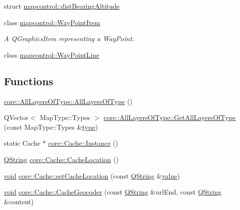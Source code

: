 \begin{DoxyCompactItemize}
struct \hyperlink{structmapcontrol_1_1dist_bearing_altitude}{mapcontrol\-::dist\-Bearing\-Altitude}
\item 
class \hyperlink{classmapcontrol_1_1_way_point_item}{mapcontrol\-::\-Way\-Point\-Item}
\begin{DoxyCompactList}\small\item\em A Q\-Graphics\-Item representing a Way\-Point. \end{DoxyCompactList}\item 
class \hyperlink{classmapcontrol_1_1_way_point_line}{mapcontrol\-::\-Way\-Point\-Line}
\end{DoxyCompactItemize}
\subsection*{Functions}
\begin{DoxyCompactItemize}
\item 
\hyperlink{group___o_p_map_widget_gac9c4b0c8a890cbccd4a9c16a57be28c4}{core\-::\-All\-Layers\-Of\-Type\-::\-All\-Layers\-Of\-Type} ()
\item 
Q\-Vector$<$ Map\-Type\-::\-Types $>$ \hyperlink{group___o_p_map_widget_gaa620f4fda0c58c2ff2919a2fef795074}{core\-::\-All\-Layers\-Of\-Type\-::\-Get\-All\-Layers\-Of\-Type} (const Map\-Type\-::\-Types \&\hyperlink{glext_8h_a7d05960f4f1c1b11f3177dc963a45d86}{type})
\item 
static Cache $\ast$ \hyperlink{group___o_p_map_widget_ga44699cf1986c874eb8375e3d795a1456}{core\-::\-Cache\-::\-Instance} ()
\item 
\hyperlink{group___u_a_v_objects_plugin_gab9d252f49c333c94a72f97ce3105a32d}{Q\-String} \hyperlink{group___o_p_map_widget_ga3b971bf3f42b18ca30dc670b0a3252fa}{core\-::\-Cache\-::\-Cache\-Location} ()
\item 
\hyperlink{group___u_a_v_objects_plugin_ga444cf2ff3f0ecbe028adce838d373f5c}{void} \hyperlink{group___o_p_map_widget_ga426941e0eaaa025997f73cd20da01189}{core\-::\-Cache\-::set\-Cache\-Location} (const \hyperlink{group___u_a_v_objects_plugin_gab9d252f49c333c94a72f97ce3105a32d}{Q\-String} \&\hyperlink{glext_8h_aa0e2e9cea7f208d28acda0480144beb0}{value})
\item 
\hyperlink{group___u_a_v_objects_plugin_ga444cf2ff3f0ecbe028adce838d373f5c}{void} \hyperlink{group___o_p_map_widget_ga1c59fdf57a8e404d9069644cc2a06d68}{core\-::\-Cache\-::\-Cache\-Geocoder} (const \hyperlink{group___u_a_v_objects_plugin_gab9d252f49c333c94a72f97ce3105a32d}{Q\-String} \&url\-End, const \hyperlink{group___u_a_v_objects_plugin_gab9d252f49c333c94a72f97ce3105a32d}{Q\-String} \&content)

\end{DoxyCompactItemize}
